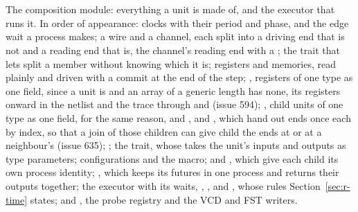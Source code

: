 \section{}
\label{sec:r-comp}

The composition module: everything a unit is made of, and the executor
that runs it. In order of appearance: clocks with their period and
phase, and the edge wait a process makes; a wire and a channel, each
split into a driving end that is not  and a reading end
that is, the channel's reading end with a ; the
 trait that lets  split a member without
knowing which it is; registers and memories, read
plainly and driven with a commit at the end of the step; ,
 registers of one type as one field, since a unit is
 and an array of a generic length has none, its
registers  onward in the netlist and the trace through
 and  (issue 594); , 
child units of one type as one field, for the same reason, and
,  and , which hand out 
ends once each by index, so that a join of those children can give
child  the ends at  or at a neighbour's (issue 635); ;
the  trait, whose  takes the unit's inputs and
outputs as type parameters; configurations and the 
macro;  and , which give each child its
own process identity; , which keeps its futures in one
process and returns their outputs together; the executor with its
waits, , ,  and
, whose rules
Section~\ref{sec:r-time} states; and , the probe registry
and the VCD and FST writers.



